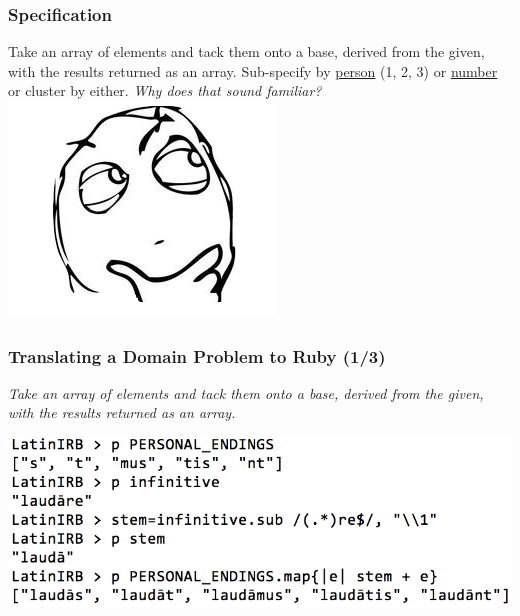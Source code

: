 \documentclass[slidestop,compress,mathserif]{beamer}
\begin{document}
\begin{frame}
	\frametitle{Specification}
	Take an array of elements and tack them onto a base, derived from the given,
with the results returned as an array.  Sub-specify by \underline{person} (1, 2, 3) or \underline{number} or cluster by either.
	\pause
	\vskip 0.5cm
	\emph{Why does that sound familiar?}
	\vskip 0.5cm
	\includegraphics[scale=0.45]{img/determined.png}
\end{frame}


\begin{frame}
	\frametitle{Translating a Domain Problem to Ruby (1/3)} 
	\emph{Take an array of elements and tack them onto a base, derived from the
    given, with the results returned as an array.
}	\begin{center}
		\includegraphics[scale=0.38]{img/conj_how.png}	
	\end{center}
\end{frame}
\end{document}
